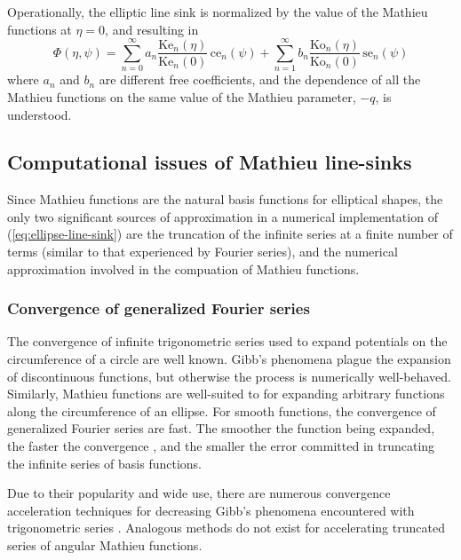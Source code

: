 \documentclass{elsart}
\begin{document}
Operationally, the elliptic line sink is normalized by the value of the Mathieu functions at $\eta=0$, and resulting in
\begin{equation}
  \label{eq:norm-ellipse-line-sink}
  \Phi(\eta,\psi) = \sum_{n=0}^{\infty} a_n \frac{\text{Ke}_{n}(\eta)}{\text{Ke}_{n}(0)} \, \text{ce}_{n}(\psi) + \sum_{n=1}^{\infty} b_n \frac{\text{Ko}_{n}(\eta)}{\text{Ko}_{n}(0)} \, \text{se}_{n}(\psi)
\end{equation}
where $a_n$ and $b_n$ are different free coefficients, and the dependence of all the Mathieu functions on the same value of the Mathieu parameter, $-q$, is understood.

\subsection{Computational issues of Mathieu line-sinks}
Since Mathieu functions are the natural basis functions for elliptical shapes, the only two significant sources of approximation in a numerical implementation of (\ref{eq:ellipse-line-sink}) are the truncation of the infinite series at a finite number of terms (similar to that experienced by Fourier series), and the numerical approximation involved in the compuation of Mathieu functions.  

\subsubsection{Convergence of generalized Fourier series}
The convergence of infinite trigonometric series used to expand potentials on the circumference of a circle are well known.  Gibb's phenomena plague the expansion of discontinuous functions, but otherwise the process is numerically well-behaved.  Similarly, Mathieu functions are well-suited to for expanding arbitrary functions along the circumference of an ellipse.  For smooth functions, the convergence of generalized Fourier series are fast.  The smoother the function being expanded, the faster the convergence \cite[\S2.6]{boyd00}, and the smaller the error committed in truncating the infinite series of basis functions.  

Due to their popularity and wide use, there are numerous convergence acceleration techniques for decreasing Gibb's phenomena encountered with trigonometric series \cite[\S4.10]{lanczos88}.  Analogous methods do not exist for accelerating truncated series of angular Mathieu functions.
\end{document}
